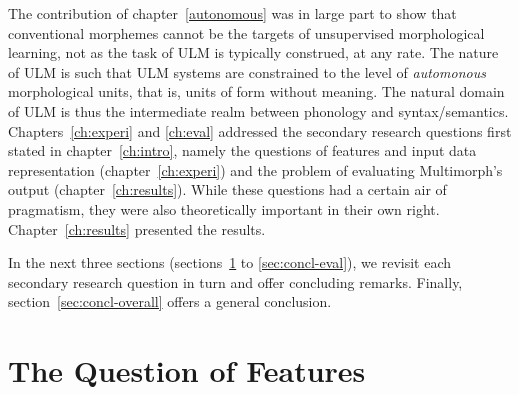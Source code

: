 The contribution of chapter~\ref{autonomous} was in large part to show that conventional morphemes cannot be the targets of unsupervised morphological learning, not as the task of ULM is typically construed, at any rate. The nature of ULM is such that ULM systems are constrained to  %
the level of \emph{automonous} morphological units, that is, %
units of form without meaning. 
The natural domain of ULM is thus the intermediate realm between phonology and syntax/semantics. 
Chapters~\ref{ch:experi} and \ref{ch:eval} addressed the secondary research questions first stated in chapter~\ref{ch:intro}, namely the questions of features and input data representation (chapter~\ref{ch:experi}) and the problem of evaluating Multimorph's output (chapter~\ref{ch:results}). While these  questions had a certain air
of pragmatism, %
they were also theoretically important in their own right.
Chapter~\ref{ch:results} presented the results. %


In the next three sections (sections~\ref{sec:concl-features} to \ref{sec:concl-eval}), we revisit each secondary research question in turn and offer concluding remarks. Finally, section~\ref{sec:concl-overall} offers a general conclusion. 

\section{The Question of Features}\label{sec:concl-features}




